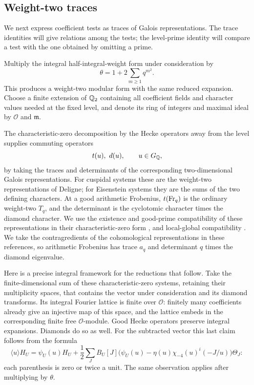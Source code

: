 \subsection{Weight-two traces}

We next express coefficient tests as traces of Galois representations.
The trace identities will give relations among the tests; the
level-prime identity will compare a test with the one obtained by
omitting a prime.

Multiply the integral half-integral-weight form under consideration by
\[
                  \theta=1+2\sum_{m\geq1}q^{m^2}.
\]
This produces a weight-two modular form with the same reduced expansion.
Choose a finite extension of $\mathbb Q_2$ containing all coefficient fields
and character values needed at the fixed level, and denote its ring of
integers and maximal ideal by $\mathcal O$ and $\mathfrak m$.

The characteristic-zero decomposition by the Hecke operators away from
the level supplies commuting operators
\[
               t(u),\ d(u),\qquad u\in G_{\mathbb Q},
\]
by taking the traces and determinants of the corresponding
two-dimensional Galois representations.  For cuspidal systems these
are the weight-two representations of Deligne; for Eisenstein systems
they are the sums of the two defining characters.  At a good arithmetic
Frobenius, $t(\operatorname{Fr}_q)$ is the ordinary weight-two $T_q$, and the
determinant is the cyclotomic character times the diamond character.
We use the existence and good-prime compatibility of these representations
in their characteristic-zero form
\citep[\S3, (3.9)--(3.12), and Theorem~4.9]{Deligne1969}, and
local-global compatibility
\citep[Theorem~(A), \S0.7]{Carayol1986}.
We take the contragredients of the cohomological representations in these
references, so arithmetic Frobenius has trace $a_q$ and determinant $q$
times the diamond eigenvalue.

Here is a precise integral framework for the reductions that follow.
Take the finite-dimensional sum of these characteristic-zero systems,
retaining their multiplicity spaces, that contains the vector under
consideration and its diamond transforms.  Its integral Fourier lattice
is finite over $\mathcal O$: finitely many coefficients already give an
injective map of this space, and the lattice embeds in the corresponding
finite free $\mathcal O$-module.  Good Hecke operators preserve integral
expansions.  Diamonds do so as well.  For the subtracted vector this last
claim follows from the formula
\[
 \langle u\rangle H_U
 =\psi_U(u)H_U+
 \frac12\sum_J B_U[J]
       \bigl(\psi_U(u)-\eta(u)\chi_{-4}(u)^i(-J/u)\bigr)\Theta_J:
\]
each parenthesis is zero or twice a unit.  The same observation applies
after multiplying by $\theta$.

